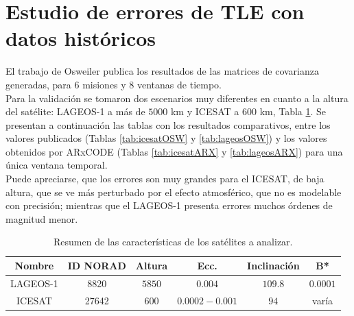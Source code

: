 \begin{table}[!h]
\centering
{}
\caption{Resultados del Systems Tool Kit (STK) propagando el mismo TLE que ARxCODE.}
\end{table}



\section{Estudio de errores de TLE con datos hist\'oricos}

El trabajo de Osweiler publica los resultados de las matrices de covarianza generadas, para 6 misiones y 8 ventanas de tiempo.\\
Para la validaci\'on se tomaron dos escenarios muy diferentes en cuanto a la altura del sat\'elite: LAGEOS-1 a m\'as de $5000$ km y ICESAT a $600 $ km, Tabla \ref{tab:satescenarios}.
Se presentan a continuaci\'on las tablas con los resultados comparativos, entre los valores publicados (Tablas \ref{tab:icesatOSW} y \ref{tab:lageosOSW}) y los valores obtenidos por ARxCODE (Tablas \ref{tab:icesatARX} y \ref{tab:lageosARX}) para una \'unica ventana temporal.\\
Puede apreciarse, que los errores son muy grandes para el ICESAT, de baja altura, que se ve m\'as perturbado por el efecto atmosf\'erico, que no es modelable con precisión; mientras que el LAGEOS-1 presenta errores muchos \'ordenes de magnitud menor.\\

\begin{table}
 \centering
      \begin{tabular}{cccccc}
      \hline
      Nombre & ID NORAD & Altura & Ecc. & Inclinaci\'on & B* \\
      \hline
      LAGEOS-1 & 8820 & $5850$ & $0.004$ & $109.8$ & $0.0001$ \\
      ICESAT & 27642 & $600$ & $0.0002 - 0.001$ & $94$ & var\'ia \\
      \hline
      \end{tabular}
    \caption[Sat\'elites de Estudio]{Resumen de las caracter\'isticas de los sat\'elites a analizar.}
    \label{tab:satescenarios}
\end{table}

